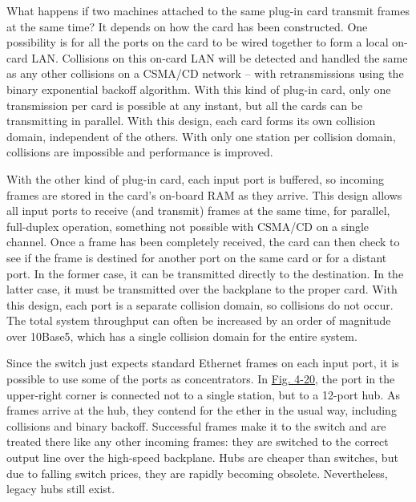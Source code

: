 What happens if two machines attached to the same plug-in card transmit
frames at the same time? It depends on how the card has been
constructed. One possibility is for all the ports on the card to be
wired together to form a local on-card LAN. Collisions on this on-card
LAN will be detected and handled the same as any other collisions on a
CSMA/CD network -- with retransmissions using the binary exponential
backoff algorithm. With this kind of plug-in card, only one transmission
per card is possible at any instant, but all the cards can be
transmitting in parallel. With this design, each card forms its own
{collision domain}, independent of the others. With only one station per
collision domain, collisions are impossible and performance is improved.

With the other kind of plug-in card, each input port is buffered, so
incoming frames are stored in the card's on-board RAM as they arrive.
This design allows all input ports to receive (and transmit) frames at
the same time, for parallel, full-duplex operation, something not
possible with CSMA/CD on a single channel. Once a frame has been
completely received, the card can then check to see if the frame is
destined for another port on the same card or for a distant port. In the
former case, it can be transmitted directly to the destination. In the
latter case, it must be transmitted over the backplane to the proper
card. With this design, each port is a separate collision domain, so
collisions do not occur. The total system throughput can often be
increased by an order of magnitude over 10Base5, which has a single
collision domain for the entire system.

Since the switch just expects standard Ethernet frames on each input
port, it is possible to use some of the ports as concentrators. In
\protect\hyperlink{0130661023_ch04lev1sec3.htmlux5cux23ch04fig20}{Fig.
4-20}, the port in the upper-right corner is connected not to a single
station, but to a 12-port hub. As frames arrive at the hub, they contend
for the ether in the usual way, including collisions and binary backoff.
Successful frames make it to the switch and are treated there like any
other incoming frames: they are switched to the correct output line over
the high-speed backplane. Hubs are cheaper than switches, but due to
falling switch prices, they are rapidly becoming obsolete. Nevertheless,
legacy hubs still exist.

\protect\hypertarget{0130661023_ch04lev1sec3.htmlux5cux23ch04lev2sec15}{}{}

